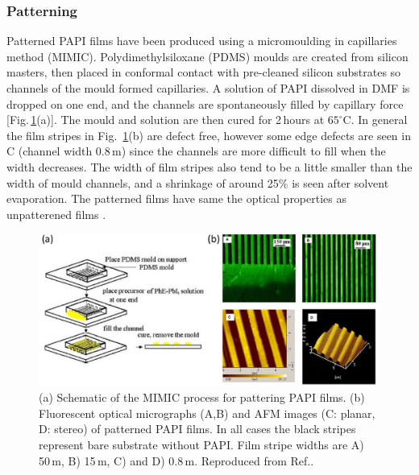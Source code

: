 \subsubsection{Patterning}
Patterned PAPI films have been produced using a micromoulding in capillaries method (MIMIC). Polydimethylsiloxane (PDMS) moulds are created from silicon masters, then placed in conformal contact with pre-cleaned silicon substrates so channels of the mould formed capillaries. A solution of PAPI dissolved in DMF is dropped on one end, and the channels are spontaneously filled by capillary force [Fig.\,\ref{2Fig11}(a)]. The mould and solution are then cured for 2\,hours at $65^{\circ}$C. In general the film stripes in Fig.\ \ref{2Fig11}(b) are defect free, however some edge defects are seen in C (channel width 0.8\,\textmu m) since the channels are more difficult to fill when the width decreases. The width of film stripes also tend to be a little smaller than the width of mould channels, and a shrinkage of around 25\% is seen after solvent evaporation.  The patterned films have same the optical properties as unpatterened films \cite{Cheng2003}.
\begin{figure} [h!]
\centering
\includegraphics[width=\textwidth]{Fig11}
\caption{(a) Schematic of the MIMIC process for pattering PAPI films. (b) Fluorescent optical micrographs (A,B) and AFM images (C: planar, D: stereo) of patterned PAPI films. In all cases the black stripes represent bare substrate without PAPI. Film stripe widths are A) 50\,\textmu m, B) 15\,\textmu m, C) and D) 0.8\,\textmu m. Reproduced from Ref.\!.}
\label{2Fig11}
\end{figure}



